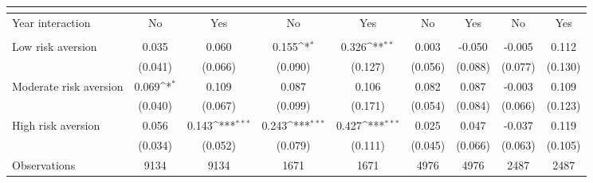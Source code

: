 {
\def\sym#1{\ifmmode^{#1}\else\(^{#1}\)\fi}
\begin{tabular}{l*{8}{c}}
\toprule
                &&&&\\
                \midrule 
                Year interaction & No & Yes & No & Yes & No & Yes & No & Yes \\
\midrule
\addlinespace
{} \\
\addlinespace
Low risk aversion&    0.035         &    0.060         &    0.155\sym{*}  &    0.326\sym{**} &    0.003         &   -0.050         &   -0.005         &    0.112         \\
                &  (0.041)         &  (0.066)         &  (0.090)         &  (0.127)         &  (0.056)         &  (0.088)         &  (0.077)         &  (0.130)         \\
\addlinespace
Moderate risk aversion&    0.069\sym{*}  &    0.109         &    0.087         &    0.106         &    0.082         &    0.087         &   -0.003         &    0.109         \\
                &  (0.040)         &  (0.067)         &  (0.099)         &  (0.171)         &  (0.054)         &  (0.084)         &  (0.066)         &  (0.123)         \\
\addlinespace
High risk aversion&    0.056         &    0.143\sym{***}&    0.243\sym{***}&    0.427\sym{***}&    0.025         &    0.047         &   -0.037         &    0.119         \\
                &  (0.034)         &  (0.052)         &  (0.079)         &  (0.111)         &  (0.045)         &  (0.066)         &  (0.063)         &  (0.105)         \\

\midrule
Observations    &     9134         &     9134         &     1671         &     1671         &     4976         &     4976         &     2487         &     2487         \\




\end{tabular}}
